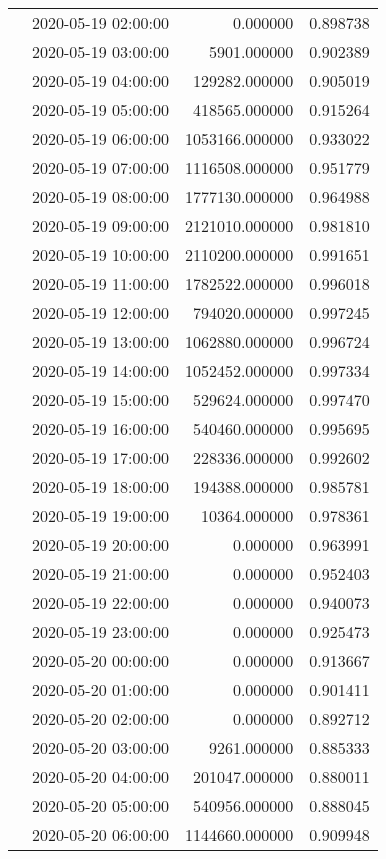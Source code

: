 \begin{tabular}{llrr}
 & 2020-05-19 02:00:00 & 0.000000 & 0.898738 \\
 & 2020-05-19 03:00:00 & 5901.000000 & 0.902389 \\
 & 2020-05-19 04:00:00 & 129282.000000 & 0.905019 \\
 & 2020-05-19 05:00:00 & 418565.000000 & 0.915264 \\
 & 2020-05-19 06:00:00 & 1053166.000000 & 0.933022 \\
 & 2020-05-19 07:00:00 & 1116508.000000 & 0.951779 \\
 & 2020-05-19 08:00:00 & 1777130.000000 & 0.964988 \\
 & 2020-05-19 09:00:00 & 2121010.000000 & 0.981810 \\
 & 2020-05-19 10:00:00 & 2110200.000000 & 0.991651 \\
 & 2020-05-19 11:00:00 & 1782522.000000 & 0.996018 \\
 & 2020-05-19 12:00:00 & 794020.000000 & 0.997245 \\
 & 2020-05-19 13:00:00 & 1062880.000000 & 0.996724 \\
 & 2020-05-19 14:00:00 & 1052452.000000 & 0.997334 \\
 & 2020-05-19 15:00:00 & 529624.000000 & 0.997470 \\
 & 2020-05-19 16:00:00 & 540460.000000 & 0.995695 \\
 & 2020-05-19 17:00:00 & 228336.000000 & 0.992602 \\
 & 2020-05-19 18:00:00 & 194388.000000 & 0.985781 \\
 & 2020-05-19 19:00:00 & 10364.000000 & 0.978361 \\
 & 2020-05-19 20:00:00 & 0.000000 & 0.963991 \\
 & 2020-05-19 21:00:00 & 0.000000 & 0.952403 \\
 & 2020-05-19 22:00:00 & 0.000000 & 0.940073 \\
 & 2020-05-19 23:00:00 & 0.000000 & 0.925473 \\
 & 2020-05-20 00:00:00 & 0.000000 & 0.913667 \\
 & 2020-05-20 01:00:00 & 0.000000 & 0.901411 \\
 & 2020-05-20 02:00:00 & 0.000000 & 0.892712 \\
 & 2020-05-20 03:00:00 & 9261.000000 & 0.885333 \\
 & 2020-05-20 04:00:00 & 201047.000000 & 0.880011 \\
 & 2020-05-20 05:00:00 & 540956.000000 & 0.888045 \\
 & 2020-05-20 06:00:00 & 1144660.000000 & 0.909948 \\

\end{tabular}
